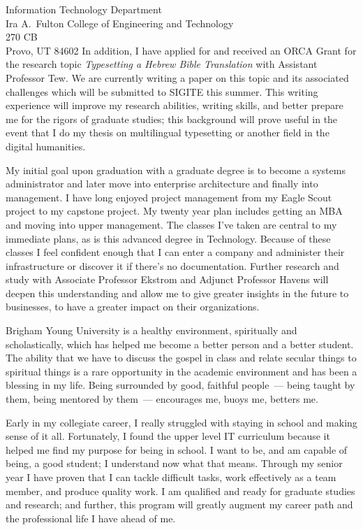\documentclass{letter}
\begin{document}
\begin{letter}{Information Technology Department \\ Ira A.\ Fulton College of Engineering and Technology \\ 270 CB \\ Provo, UT 84602}
In addition, I have applied for and received an ORCA Grant for the research topic \textit{Typesetting a Hebrew Bible Translation} with Assistant Professor Tew. We are currently writing a paper on this topic and its associated challenges which will be submitted to SIGITE this summer. This writing experience will improve my research abilities, writing skills, and better prepare me for the rigors of graduate studies; this background will prove useful in the event that I do my thesis on multilingual typesetting or another field in the digital humanities.

My initial goal upon graduation with a graduate degree is to become a systems administrator and later move into enterprise architecture and finally into management. I have long enjoyed project management from my Eagle Scout project to my capstone project. My twenty year plan includes getting an MBA and moving into upper management. The classes I've taken are central to my immediate plans, as is this advanced degree in Technology. Because of these classes I feel confident enough that I can enter a company and administer their infrastructure or discover it if there's no documentation. Further research and study with Associate Professor Ekstrom and Adjunct Professor Havens will deepen this understanding and allow me to give greater insights in the future to businesses, to have a greater impact on their organizations.

Brigham Young University is a healthy environment, spiritually and scholastically, which has helped me become a better person and a better student. The ability that we have to discuss the gospel in class and relate secular things to spiritual things is a rare opportunity in the academic environment and has been a blessing in my life. Being surrounded by good, faithful people~--- being taught by them, being mentored by them~--- encourages me, buoys me, betters me.

Early in my collegiate career, I really struggled with staying in school and making sense of it all. Fortunately, I found the upper level IT curriculum because it helped me find my purpose for being in school. I want to be, and am capable of being, a good student; I understand now what that means. Through my senior year I have proven that I can tackle difficult tasks, work effectively as a team member, and produce quality work. I am qualified and ready for graduate studies and research; and further, this program will greatly augment my career path and the professional life I have ahead of me.


\end{letter}
\end{document}

